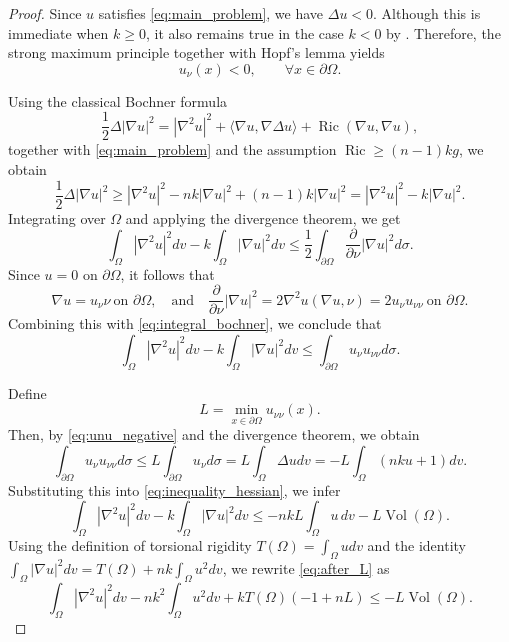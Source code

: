 \documentclass[reqno,11pt]{amsart}
\numberwithin{equation}{section}  %
\begin{document}
\begin{proof}
Since $u$ satisfies \eqref{eq:main_problem}, we have $\Delta u<0$. Although this is immediate when $k\geq 0$, it also remains true in the case $k<0$ by \cite[Lemma 5.2]{andrade2025}. Therefore, the strong maximum principle together with Hopf's lemma yields
\begin{equation}\label{eq:unu_negative}
u_{\nu}(x)<0,\qquad \forall x\in\partial\Omega.
\end{equation}

Using the classical Bochner formula
\[\frac{1}{2}\Delta |\nabla u|^2 = |\nabla^2 u|^2 +\langle \nabla u,\nabla \Delta u\rangle +\operatorname{Ric}(\nabla u,\nabla u),\]
together with \eqref{eq:main_problem} and the assumption $\operatorname{Ric}\geq (n-1)kg$, we obtain
\begin{equation}\label{eq:bochner_estimate}
\frac{1}{2}\Delta |\nabla u|^2\geq |\nabla^2 u|^2 -nk|\nabla u|^2 +(n-1)k|\nabla u|^2 = |\nabla^2 u|^2 -k|\nabla u|^2.
\end{equation}
Integrating over $\Omega$ and applying the divergence theorem, we get
\begin{equation}\label{eq:integral_bochner}
\int_{\Omega}|\nabla^2 u|^2dv -k\int_{\Omega}|\nabla u|^2dv\leq \frac{1}{2}\int_{\partial\Omega}\frac{\partial}{\partial\nu} |\nabla u|^2d\sigma.
\end{equation}
Since $u = 0$ on $\partial\Omega$, it follows that
\begin{equation}\label{eq:boundary_grad}
\nabla u = u_{\nu}\nu\ \text{on }\partial\Omega,\quad\text{and}\quad \frac{\partial}{\partial\nu} |\nabla u|^2 = 2\nabla^2 u(\nabla u,\nu) = 2u_{\nu}u_{\nu\nu}\ \text{on }\partial\Omega.
\end{equation}
Combining this with \eqref{eq:integral_bochner}, we conclude that
\begin{equation}\label{eq:inequality_hessian}
\int_{\Omega}|\nabla^2 u|^2dv -k\int_{\Omega}|\nabla u|^2dv\leq \int_{\partial\Omega}u_{\nu}u_{\nu\nu}d\sigma.
\end{equation}

Define
\[L = \min_{x\in\partial\Omega} u_{\nu\nu}(x).\]
Then, by \eqref{eq:unu_negative} and the divergence theorem, we obtain
\[\int_{\partial\Omega}u_{\nu}u_{\nu\nu}d\sigma\leq L\int_{\partial\Omega}u_{\nu}d\sigma = L\int_{\Omega}\Delta u dv= -L\int_{\Omega}(nku+1)dv.\]
Substituting this into \eqref{eq:inequality_hessian}, we infer
\begin{equation}\label{eq:after_L}
\int_{\Omega}|\nabla^2 u|^2dv -k\int_{\Omega}|\nabla u|^2dv\leq -nkL\int_{\Omega}u \, dv- L\operatorname{Vol}(\Omega).
\end{equation}
Using the definition of torsional rigidity $T(\Omega)=\int_{\Omega}udv$ and the identity $\int_{\Omega}|\nabla u|^2dv = T(\Omega)+nk\int_{\Omega}u^2dv$, we rewrite \eqref{eq:after_L} as
\begin{equation}\label{eq:before_CS}
\int_{\Omega}|\nabla^2 u|^2dv -nk^2\int_{\Omega}u^2dv +kT(\Omega)(-1+nL)\leq -L\operatorname{Vol}(\Omega).
\end{equation}


\end{proof}
\end{document}
